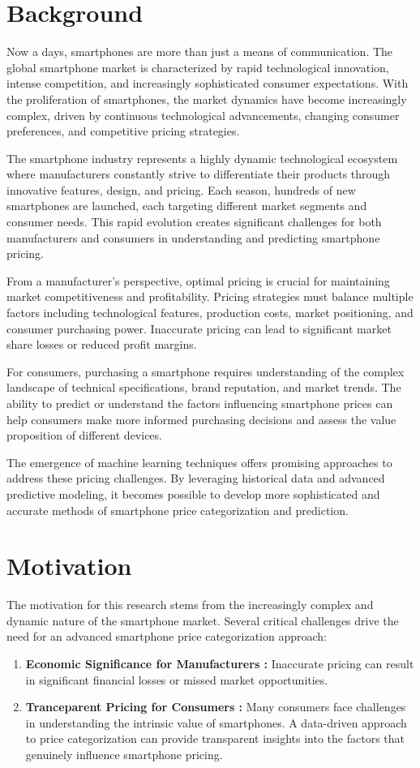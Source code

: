 \documentclass[12pt]{report}
\begin{document}
\section{Background}
Now a days, smartphones are more than just a means of communication. The global smartphone market is characterized by rapid technological innovation, intense competition, and increasingly sophisticated consumer expectations. With the proliferation of smartphones, the market dynamics have become increasingly complex, driven by continuous technological advancements, changing consumer preferences, and competitive pricing strategies.

The smartphone industry represents a highly dynamic technological ecosystem where manufacturers constantly strive to differentiate their products through innovative features, design, and pricing. Each season, hundreds of new smartphones are launched, each targeting different market segments and consumer needs. This rapid evolution creates significant challenges for both manufacturers and consumers in understanding and predicting smartphone pricing.

From a manufacturer's perspective, optimal pricing is crucial for maintaining market competitiveness and profitability. Pricing strategies must balance multiple factors including technological features, production costs, market positioning, and consumer purchasing power. Inaccurate pricing can lead to significant market share losses or reduced profit margins.

For consumers, purchasing a smartphone requires understanding of the complex landscape of technical specifications, brand reputation, and market trends. The ability to predict or understand the factors influencing smartphone prices can help consumers make more informed purchasing decisions and assess the value proposition of different devices.

The emergence of machine learning techniques offers promising approaches to address these pricing challenges. By leveraging historical data and advanced predictive modeling, it becomes possible to develop more sophisticated and accurate methods of smartphone price categorization and prediction.
\section{Motivation}
The motivation for this research stems from the increasingly complex and dynamic nature of the smartphone market. Several critical challenges drive the need for an advanced smartphone price categorization approach:
\vspace{-1.25em}
\begin{enumerate}
	\setlength\itemsep{-1.05em}
	\item{\textbf{Economic Significance for Manufacturers :}} Inaccurate pricing can result in significant financial losses or missed market opportunities.
	\item{\textbf{Tranceparent Pricing for Consumers :}} Many consumers face challenges in understanding the intrinsic value of smartphones. A data-driven approach to price categorization can provide transparent insights into the factors that genuinely influence smartphone pricing.
\end{enumerate}
\end{document}
